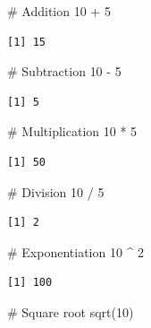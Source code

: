 \documentclass[
  letterpaper,
]{krantz}
\makeatletter
\newenvironment{Shaded}{\begin{snugshade}}{\end{snugshade}}
\newcommand{\CommentTok}[1]{\textcolor[rgb]{0.37,0.37,0.37}{#1}}
\newcommand{\DecValTok}[1]{\textcolor[rgb]{0.68,0.00,0.00}{#1}}
\newcommand{\FunctionTok}[1]{\textcolor[rgb]{0.28,0.35,0.67}{#1}}
\newcommand{\NormalTok}[1]{\textcolor[rgb]{0.00,0.23,0.31}{#1}}
\newcommand{\SpecialCharTok}[1]{\textcolor[rgb]{0.37,0.37,0.37}{#1}}
\newenvironment{kframe}{%
\medskip{}
\setlength{\fboxsep}{.8em}
 \def\at@end@of@kframe{}%
 \ifinner\ifhmode%
  \def\at@end@of@kframe{\end{minipage}}%
  \begin{minipage}{\columnwidth}%
 \fi\fi%
 \def\FrameCommand##1{\hskip\@totalleftmargin \hskip-\fboxsep
 \colorbox{shadecolor}{##1}\hskip-\fboxsep
     \hskip-\linewidth \hskip-\@totalleftmargin \hskip\columnwidth}%
 \MakeFramed {\advance\hsize-\width
   \@totalleftmargin\z@ \linewidth\hsize
   \@setminipage}}%
 {\par\unskip\endMakeFramed%
 \at@end@of@kframe}
\renewenvironment{Shaded}{\begin{kframe}}{\end{kframe}}
\makeatother
\begin{document}
\begin{Shaded}
\begin{Highlighting}[]
\CommentTok{\# Addition}
\DecValTok{10} \SpecialCharTok{+} \DecValTok{5}
\end{Highlighting}
\end{Shaded}

\begin{verbatim}
[1] 15
\end{verbatim}

\begin{Shaded}
\begin{Highlighting}[]
\CommentTok{\# Subtraction}
\DecValTok{10} \SpecialCharTok{{-}} \DecValTok{5}
\end{Highlighting}
\end{Shaded}

\begin{verbatim}
[1] 5
\end{verbatim}

\begin{Shaded}
\begin{Highlighting}[]
\CommentTok{\# Multiplication}
\DecValTok{10} \SpecialCharTok{*} \DecValTok{5}
\end{Highlighting}
\end{Shaded}

\begin{verbatim}
[1] 50
\end{verbatim}

\begin{Shaded}
\begin{Highlighting}[]
\CommentTok{\# Division}
\DecValTok{10} \SpecialCharTok{/} \DecValTok{5}
\end{Highlighting}
\end{Shaded}

\begin{verbatim}
[1] 2
\end{verbatim}

\begin{Shaded}
\begin{Highlighting}[]
\CommentTok{\# Exponentiation}
\DecValTok{10} \SpecialCharTok{\^{}} \DecValTok{2}
\end{Highlighting}
\end{Shaded}

\begin{verbatim}
[1] 100
\end{verbatim}

\begin{Shaded}
\begin{Highlighting}[]
\CommentTok{\# Square root}
\FunctionTok{sqrt}\NormalTok{(}\DecValTok{10}\NormalTok{)}
\end{Highlighting}
\end{Shaded}
\end{document}
